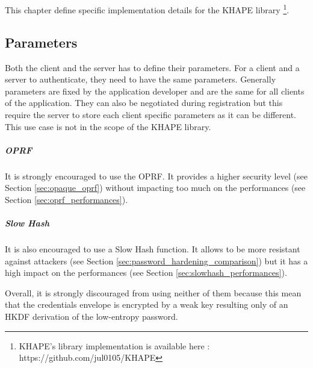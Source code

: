 ﻿\documentclass[../report.tex]{subfiles}
\begin{document}


\chapter{} \label{cha:implementation}
This chapter define specific implementation details for the KHAPE library \footnote{KHAPE's library implementation is available here : https://github.com/jul0105/KHAPE}.


\section{Parameters}
Both the client and the server has to define their parameters. For a client and a server to authenticate, they need to have the same parameters. 
Generally parameters are fixed by the application developer and are the same for all clients of the application.
They can also be negotiated during registration but this require the server to store each client specific parameters as it can be different. This use case is not in the scope of the KHAPE library.


\paragraph{OPRF}
It is strongly encouraged to use the OPRF.
It provides a higher security level (see Section \ref{sec:opaque_oprf}) without impacting too much on the performances (see Section \ref{sec:oprf_performances}).


\paragraph{Slow Hash}
It is also encouraged to use a Slow Hash function. It allows to be more resistant against attackers (see Section \ref{sec:password_hardening_comparison}) but it has a high impact on the performances (see Section \ref{sec:slowhash_performances}).

Overall, it is strongly discouraged from using neither of them because this mean that the credentials envelope is encrypted by a weak key resulting only of an HKDF derivation of the low-entropy password.
\end{document}
